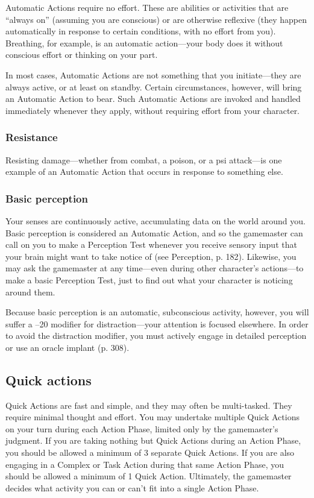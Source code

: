Automatic Actions require no effort. These are abilities or activities that are ``always on''  (assuming you are conscious) or are otherwise reflexive (they happen automatically in response to certain conditions, with no effort from you). Breathing, for example, is an automatic action—your body does it without conscious effort or thinking on your part.

In most cases, Automatic Actions are not something that you initiate—they are always active, or at least on standby. Certain circumstances, however, will bring an Automatic Action to bear. Such Automatic Actions are invoked and handled immediately whenever they apply, without requiring effort from your character.

\subsubsection{Resistance} Resisting damage—whether from combat, a poison, or a psi attack—is one example of an Automatic Action that occurs in response to something else.

\subsubsection{Basic perception} Your senses are continuously active, accumulating data on the world around you. Basic perception is considered an Automatic Action, and so the gamemaster can call on you to make a Perception Test whenever you receive sensory input that your brain might want to take notice of (see Perception, p. 182). Likewise, you may ask the gamemaster at any time—even during other character’s actions—to make a basic Perception Test, just to find out what your character is noticing around them.

Because basic perception is an automatic, subconscious activity, however, you will suffer a –20 modifier for distraction—your attention is focused elsewhere. In order to avoid the distraction modifier, you must actively engage in detailed perception or use an oracle implant (p. 308).


\subsection{Quick actions}
\label{sec:quick-actions}

Quick Actions are fast and simple, and they may often be multi-tasked. They require minimal thought and effort. You may undertake multiple Quick Actions on your turn during each Action Phase, limited only by the gamemaster’s judgment. If you are taking nothing but Quick Actions during an Action Phase, you should be allowed a minimum of 3 separate Quick Actions. If you are also engaging in a Complex or Task Action during that same Action Phase, you should be allowed a minimum of 1 Quick Action. Ultimately, the gamemaster decides what activity you can or can’t fit into a single Action Phase.

